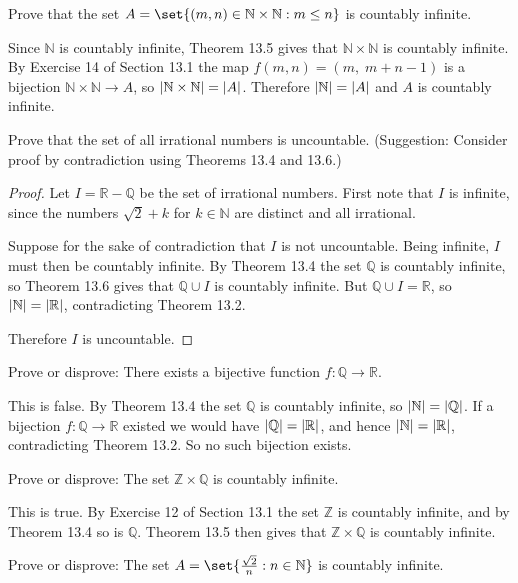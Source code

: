 \documentclass[DIN, pagenumber=false, fontsize=11pt, parskip=half]{scrartcl}
\begin{document}
\begin{problems}
    \problem Prove that the set $A = \set{(m,n) \in \mathbb{N} \times \mathbb{N} : m \leq n}$ is countably infinite.

    \answer Since $\mathbb{N}$ is countably infinite, Theorem 13.5 gives that $\mathbb{N} \times \mathbb{N}$ is countably infinite. By Exercise 14 of Section 13.1 the map $f(m,n) = (m,\; m+n-1)$ is a bijection $\mathbb{N} \times \mathbb{N} \to A$, so $\lvert \mathbb{N} \times \mathbb{N} \rvert = \lvert A \rvert$. Therefore $\lvert \mathbb{N} \rvert = \lvert A \rvert$ and $A$ is countably infinite.

    \problem Prove that the set of all irrational numbers is uncountable. (Suggestion: Consider proof by contradiction using Theorems 13.4 and 13.6.)
    \begin{proof}
        Let $I = \mathbb{R} - \mathbb{Q}$ be the set of irrational numbers. First note that $I$ is infinite, since the numbers $\sqrt{2} + k$ for $k \in \mathbb{N}$ are distinct and all irrational.

        Suppose for the sake of contradiction that $I$ is not uncountable. Being infinite, $I$ must then be countably infinite. By Theorem 13.4 the set $\mathbb{Q}$ is countably infinite, so Theorem 13.6 gives that $\mathbb{Q} \cup I$ is countably infinite. But $\mathbb{Q} \cup I = \mathbb{R}$, so $\lvert \mathbb{N} \rvert = \lvert \mathbb{R} \rvert$, contradicting Theorem 13.2.

        Therefore $I$ is uncountable.
    \end{proof}

    \problem Prove or disprove: There exists a bijective function $f : \mathbb{Q} \to \mathbb{R}$.

    \answer This is false. By Theorem 13.4 the set $\mathbb{Q}$ is countably infinite, so $\lvert \mathbb{N} \rvert = \lvert \mathbb{Q} \rvert$. If a bijection $f : \mathbb{Q} \to \mathbb{R}$ existed we would have $\lvert \mathbb{Q} \rvert = \lvert \mathbb{R} \rvert$, and hence $\lvert \mathbb{N} \rvert = \lvert \mathbb{R} \rvert$, contradicting Theorem 13.2. So no such bijection exists.

    \problem Prove or disprove: The set $\mathbb{Z} \times \mathbb{Q}$ is countably infinite.

    \answer This is true. By Exercise 12 of Section 13.1 the set $\mathbb{Z}$ is countably infinite, and by Theorem 13.4 so is $\mathbb{Q}$. Theorem 13.5 then gives that $\mathbb{Z} \times \mathbb{Q}$ is countably infinite.

    \problem Prove or disprove: The set $A = \set{\frac{\sqrt{2}}{n} : n \in \mathbb{N}}$ is countably infinite.


\end{problems}
\end{document}
